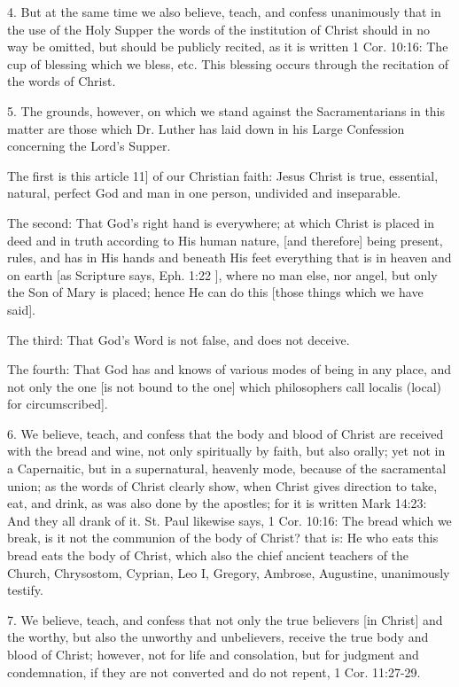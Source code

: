 4. But at the same time we also believe, teach, and confess unanimously that in the use of the Holy Supper the words of the institution of Christ should in no way be omitted, but should be publicly recited, as it is written 1 Cor. 10:16: The cup of blessing which we bless, etc. This blessing occurs through the recitation of the words of Christ.

5. The grounds, however, on which we stand against the Sacramentarians in this matter are those which Dr. Luther has laid down in his Large Confession concerning the Lord's Supper.

The first is this article 11] of our Christian faith: Jesus Christ is true, essential, natural, perfect God and man in one person, undivided and inseparable.

The second: That God's right hand is everywhere; at which Christ is placed in deed and in truth according to His human nature, [and therefore] being present, rules, and has in His hands and beneath His feet everything that is in heaven and on earth [as Scripture says, Eph. 1:22 ], where no man else, nor angel, but only the Son of Mary is placed; hence He can do this [those things which we have said].

The third: That God's Word is not false, and does not deceive.

The fourth: That God has and knows of various modes of being in any place, and not only the one [is not bound to the one] which philosophers call localis (local) for circumscribed].

6. We believe, teach, and confess that the body and blood of Christ are received with the bread and wine, not only spiritually by faith, but also orally; yet not in a Capernaitic, but in a supernatural, heavenly mode, because of the sacramental union; as the words of Christ clearly show, when Christ gives direction to take, eat, and drink, as was also done by the apostles; for it is written Mark 14:23: And they all drank of it. St. Paul likewise says, 1 Cor. 10:16: The bread which we break, is it not the communion of the body of Christ? that is: He who eats this bread eats the body of Christ, which also the chief ancient teachers of the Church, Chrysostom, Cyprian, Leo I, Gregory, Ambrose, Augustine, unanimously testify.

7. We believe, teach, and confess that not only the true believers [in Christ] and the worthy, but also the unworthy and unbelievers, receive the true body and blood of Christ; however, not for life and consolation, but for judgment and condemnation, if they are not converted and do not repent, 1 Cor. 11:27-29.

